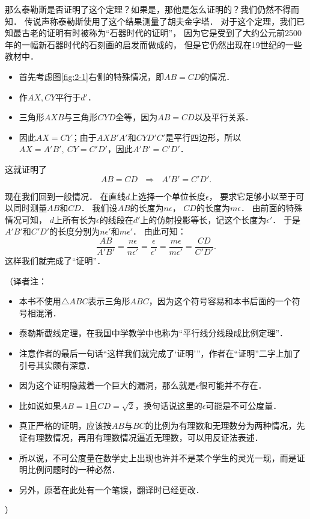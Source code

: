 \documentclass[cn,fancy,blue,11pt]{elegantbook}
\begin{document}
那么泰勒斯是否证明了这个定理？如果是，那他是怎么证明的？我们仍然不得而知．
传说声称泰勒斯使用了这个结果测量了胡夫金字塔．
对于这个定理，我们已知最古老的证明有时被称为``石器时代的证明''，
因为它是受到了大约公元前2500年的一幅新石器时代的石刻画的启发而做成的，
但是它仍然出现在19世纪的一些教材中．

\begin{itemize}
	\item 首先考虑图\ref{fig:2-1}右侧的特殊情况，即$AB=CD$的情况．
	\item 作$AX,CY$平行于$d'$．
	\item 三角形$AXB$与三角形$CYD$全等，因为$AB=CD$以及平行关系．
	\item 因此$AX=CY$；由于$AXB'A'$和$CYD'C'$是平行四边形，所以$AX=A'B',~CY=C'D'$，因此$A'B'=C'D'$．
\end{itemize}
这就证明了\[AB=CD~~~\Longrightarrow~~~A'B'=C'D'.\]

现在我们回到一般情况．
在直线$d$上选择一个单位长度$\epsilon$，
要求它足够小以至于可以同时测量$AB$和$CD$．
我们设$AB$的长度为$n\epsilon$，
$CD$的长度为$m\epsilon$．
由前面的特殊情况可知，
$d$上所有长为$\epsilon$的线段在$d'$上的仿射投影等长，记这个长度为$\epsilon'$．
于是$A'B'$和$C'D'$的长度分别为$n\epsilon'$和$m\epsilon'$．
由此可知：
\[\frac{AB}{A'B'}=\frac{n\epsilon}{n\epsilon'}=\frac{\epsilon}{\epsilon'}
=\frac{m\epsilon}{m\epsilon'}=\frac{CD}{C'D'}.\]
这样我们就完成了``证明''．

\vskip 10pt
（译者注：
\begin{itemize}
	\item 本书不使用$\triangle ABC$表示三角形$ABC$，因为这个符号容易和本书后面的一个符号相混淆．
	\item 泰勒斯截线定理，在我国中学教学中也称为``平行线分线段成比例定理''．
	\item 注意作者的最后一句话``这样我们就完成了`证明'''，作者在``证明''二字上加了引号其实颇有深意．
	\item 因为这个证明隐藏着一个巨大的漏洞，那么就是$\epsilon$很可能并不存在．
	\item 比如说如果$AB=1$且$CD=\sqrt{2}$，换句话说这里的$\epsilon$可能是不可公度量．
	\item 真正严格的证明，应该按$AB$与$BC$的比例为有理数和无理数分为两种情况，先证有理数情况，再用有理数情况逼近无理数，可以用反证法表述．
	\item 所以说，不可公度量在数学史上出现也许并不是某个学生的灵光一现，而是证明比例问题时的一种必然．
	\item 另外，原著在此处有一个笔误，翻译时已经更改．
\end{itemize}
）
\end{document}
